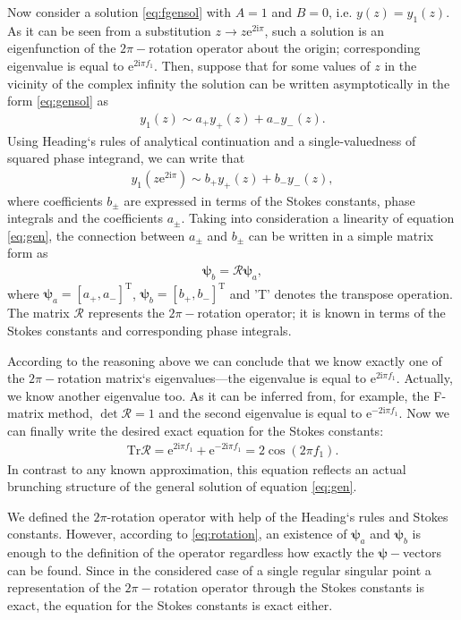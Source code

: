 \documentclass[aip,jmp,reprint]{revtex4-1}
\def\rmi{\mathrm{i}}
\def\rme{\mathrm{e}}
\def\psii{\bm{\psi}}
\def\R{\bm{\mathcal{R}}}
\def\T{\mathrm{T}}
\def\Tr{\mathrm{Tr}}
\begin{document}
Now consider a solution \eqref{eq:fgensol} with $A=1$ and $B=0$, i.e. $y(z)=y_1(z)$. 
As it can be seen from a substitution \mbox{$z \rightarrow z \rme^{2 \rmi \pi}$}, 
such a solution is an eigenfunction of the $2\pi-$rotation operator about the origin; 
corresponding eigenvalue is equal to $\rme^{2 \rmi \pi f_1}$.  
Then, suppose that for some values of $z$ in the vicinity of the complex infinity 
the solution can be written asymptotically in the form \eqref{eq:gensol} as
\begin{eqnarray}
y_1(z) \sim a_+y_+(z) + a_-y_-(z).
\end{eqnarray}
Using Heading`s rules of analytical continuation\cite{heading, rwbook} and a single-valuedness 
of squared phase integrand, we can write that
\begin{eqnarray}
y_1(z \rme^{2 \rmi \pi}) \sim b_+y_+(z) + b_-y_-(z),
\end{eqnarray}
where coefficients $b_{\pm}$ are expressed in terms of the Stokes constants, phase integrals and 
the coefficients $a_{\pm}$. Taking into consideration a linearity of equation \eqref{eq:gen}, 
the connection between $a_{\pm}$ and $b_{\pm}$ can be written in a simple matrix form as
\begin{eqnarray}
\psii_b = \R \psii_a,
\label{eq:rotation}
\end{eqnarray}
where $\psii_a = [{a_+,a_-}]^{\T}$, $\psii_b = [{b_+,b_-}]^{\T}$ and 'T' denotes the transpose operation.
The matrix $\R$ represents the $2\pi-$rotation operator; it is known in terms of
the Stokes constants and corresponding phase integrals. 

According to the reasoning above we can conclude
that we know exactly one of the $2\pi-$rotation matrix`s eigenvalues---the eigenvalue is 
equal to $\rme^{2 \rmi \pi f_1}$. Actually, we know another eigenvalue too. 
As it can be inferred from, for example, the F-matrix method\cite{frbook}, $\det\R=1$ and the second eigenvalue is equal 
to $\rme^{-2 \rmi \pi f_1}$. Now we can finally write the desired exact equation for the Stokes constants:
\begin{eqnarray}
\Tr\R = \rme^{2 \rmi \pi f_1} + \rme^{-2 \rmi \pi f_1} = 2 \cos(2 \pi f_1).
\label{eq:main}
\end{eqnarray}
In contrast to any known approximation, this equation reflects an actual brunching structure 
of the general solution of equation \eqref{eq:gen}. 

We defined the $2\pi$-rotation operator with help of the Heading`s rules and Stokes constants. However, 
according to \eqref{eq:rotation}, an existence of $\psii_a$ and $\psii_b$ is enough to the definition of
the operator regardless how exactly the $\psii-$vectors can be found. Since in the considered case of a 
single regular singular point a representation of the $2\pi-$rotation operator through the Stokes constants 
is exact, the equation for the Stokes constants is exact either. 
\end{document}
